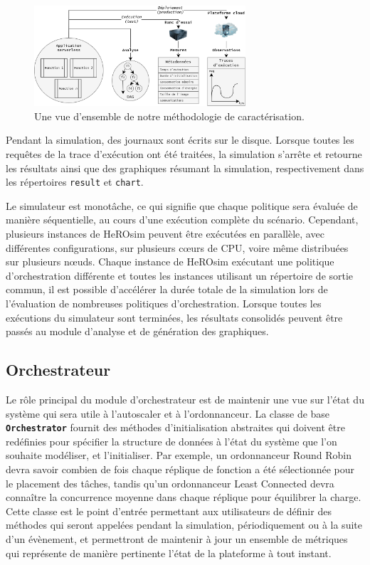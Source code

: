 \begin{figure}[!ht]
    \centering
    \includegraphics[width=0.7\textwidth]{6_Chapitre6/figures/characterization.png}
    \caption{Une vue d'ensemble de notre méthodologie de caractérisation.}
\label{figure:herosim-characterization}
\end{figure}

Pendant la simulation, des journaux sont écrits sur le disque. Lorsque toutes les requêtes de la trace d'exécution ont été traitées, la simulation s'arrête et retourne les résultats ainsi que des graphiques résumant la simulation, respectivement dans les répertoires \texttt{result} et \texttt{chart}.

Le simulateur est monotâche, ce qui signifie que chaque politique sera évaluée de manière séquentielle, au cours d'une exécution complète du scénario. Cependant, plusieurs instances de HeROsim peuvent être exécutées en parallèle, avec différentes configurations, sur plusieurs cœurs de \gls{CPU}, voire même distribuées sur plusieurs nœuds. Chaque instance de HeROsim exécutant une politique d'orchestration différente et toutes les instances utilisant un répertoire de sortie commun, il est possible d'accélérer la durée totale de la simulation lors de l'évaluation de nombreuses politiques d'orchestration. Lorsque toutes les exécutions du simulateur sont terminées, les résultats consolidés peuvent être passés au module d'analyse et de génération des graphiques.

\subsection{Orchestrateur}

Le rôle principal du module d'orchestrateur est de maintenir une vue sur l'état du système qui sera utile à l'autoscaler et à l'ordonnanceur. La classe de base \textbf{\texttt{Orchestrator}} fournit des méthodes d'initialisation abstraites qui doivent être redéfinies pour spécifier la structure de données à l'état du système que l'on souhaite modéliser, et l'initialiser. Par exemple, un ordonnanceur Round Robin devra savoir combien de fois chaque réplique de fonction a été sélectionnée pour le placement des tâches, tandis qu'un ordonnanceur Least Connected devra connaître la concurrence moyenne dans chaque réplique pour équilibrer la charge. Cette classe est le point d'entrée permettant aux utilisateurs de définir des méthodes qui seront appelées pendant la simulation, périodiquement ou à la suite d'un évènement, et permettront de maintenir à jour un ensemble de métriques qui représente de manière pertinente l'état de la plateforme à tout instant.

